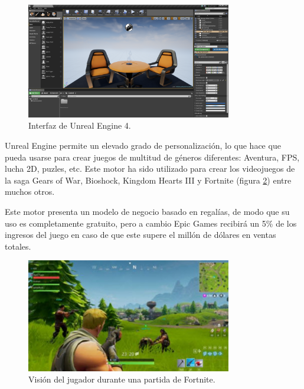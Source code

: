 \begin{figure}[H]
  \centering
\includegraphics[width=0.8\textwidth]{03.EstudioProblema/01.EstadoArte/00.Figuras/28.interfaz_unreal.png}
    \caption{Interfaz de Unreal Engine 4. \cite{EA_img_interfazUnreal}}
    \label{fig:EA_interfazUnreal}
\end{figure}

Unreal Engine permite un elevado grado de personalización, lo que hace que pueda usarse para crear juegos de multitud de géneros diferentes: Aventura, FPS, lucha 2D, puzles, etc. Este motor ha sido utilizado para crear los videojuegos de la saga Gears of War, Bioshock, Kingdom Hearts III y Fortnite (figura \ref{fig:EA_fortnite}) entre muchos otros. \cite{EA_engine_unreal}

Este motor presenta un modelo de negocio basado en regalías, de modo que su uso es completamente gratuito, pero a cambio Epic Games recibirá un 5\% de los ingresos del juego en caso de que este supere el millón de dólares en ventas totales. \cite{EA_engine_unrealroyalties}




\begin{figure}[H]
  \centering
\includegraphics[width=0.8\textwidth]{03.EstudioProblema/01.EstadoArte/00.Figuras/29.fortnite.jpg}
    \caption{Visión del jugador durante una partida de Fortnite. \cite{EA_img_fortnite}}
    \label{fig:EA_fortnite}
\end{figure}





